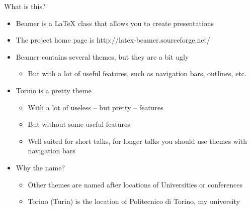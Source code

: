 
\begin{frame}[t,plain]
\titlepage
\end{frame}

\begin{frame}[t]{What is this?}
\begin{itemize}
\item Beamer is a \LaTeX{} class that allows you to create presentations
\item The project home page is http://latex-beamer.sourceforge.net/
\item Beamer contains several themes, but they are a bit ugly
  \begin{itemize}
  \item But with a lot of useful features, such as navigation bars, outlines,
        etc.
  \end{itemize}
\item Torino is a pretty theme
  \begin{itemize}
  \item With a lot of useless -- but pretty -- features
  \item But without some useful features
  \item Well suited for short talks, for longer talks you should use themes
        with navigation bars
  \end{itemize}
\item Why the name?
  \begin{itemize}
  \item Other themes are named after locations of Universities or conferences
  \item Torino (Turin) is the location of Politecnico di Torino, my university
  \end{itemize}
\end{itemize}
\end{frame}


